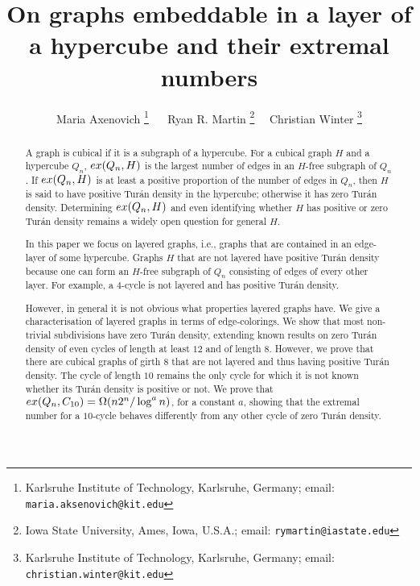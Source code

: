 \documentclass[11pt, a4paper]{article}
\newcommand{\ex}{{\rm  ex}}
\begin{document}
	\title{On graphs embeddable in a layer of a hypercube and their extremal numbers}
	\date{\vspace{-5ex}}
	\author{
		Maria Axenovich
		\thanks{Karlsruhe Institute of Technology, Karlsruhe, Germany;
			email:
			\mbox{\texttt{maria.aksenovich@kit.edu}}
}
 ~~ Ryan R.  Martin  
\thanks{Iowa State University, Ames, Iowa, U.S.A.;
			email:
			 \texttt{rymartin@iastate.edu}}						
~~Christian Winter			
\thanks{Karlsruhe Institute of Technology, Karlsruhe, Germany;
			email:
			\mbox{\texttt{christian.winter@kit.edu}}
}}
			
	\maketitle
	
	\begin{abstract}
	A graph is cubical if it is a subgraph of a hypercube. For a cubical graph $H$ and a hypercube $Q_n$, $\ex(Q_n, H)$ is the largest number of edges in an $H$-free subgraph of $Q_n$.
If $\ex(Q_n, H)$ is at least  a positive proportion of the number of edges in $Q_n$, then $H$ is said to have positive Tur\'an density in the hypercube; otherwise it has zero Tur\'an density.   Determining $\ex(Q_n, H)$ and even identifying whether $H$ has positive or zero Tur\'an density remains a widely open question for general $H$. 
	
 In this paper we focus on layered graphs, i.e., graphs that  are contained in an edge-layer of some hypercube. Graphs $H$ that are not layered have positive Tur\'an density because one can form an $H$-free subgraph of $Q_n$ consisting of edges of every other layer.  For example, a $4$-cycle is not layered and has positive Tur\'an density.  
 
However, in general it is not obvious what properties layered graphs have. We give a characterisation of layered graphs in terms of edge-colorings.
We show that most non-trivial subdivisions have zero Tur\'an density, extending known results on zero Tur\'an density of  even cycles of length at least $12$ and of length $8$. However,  we prove that there are cubical graphs of girth $8$ that are not layered and thus having positive Tur\'an density. 
The cycle of length $10$ remains the only cycle for which it is not known whether its Tur\'an density is positive or not.   We prove that $\ex(Q_n, C_{10})= \Omega(n2^n/ \log^a n)$, for a constant $a$, showing that the extremal number for a $10$-cycle behaves differently from any other cycle of zero Tur\'an density. 
	\end{abstract}
	
\end{document}
